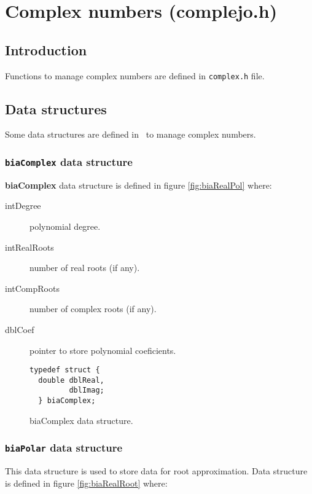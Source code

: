 %
%

\chapter{Complex numbers (complejo.h)}

\section{Introduction}

Functions to manage complex numbers are defined in \texttt{complex.h} file.

\section{Data structures}

Some data structures are defined in \BI \ to manage complex numbers.

\subsection{\texttt{biaComplex} data structure} \label{sec:biaComplex}

\textbf{biaComplex} data structure is defined in figure \ref{fig:biaRealPol} where:

\begin{description}
\item[intDegree] polynomial degree.
\item[intRealRoots] number of real roots (if any).
\item[intCompRoots] number of complex roots (if any).
\item[dblCoef] pointer to store polynomial coeficients.
\end{description}

\begin{figure}[!h]
\begin{verbatim}
typedef struct {
  double dblReal,
         dblImag;
  } biaComplex;
\end{verbatim}
\caption{biaComplex data structure.} \label{fig:biaComplex}
\end{figure}

\subsection{\texttt{biaPolar} data structure} \label{sec:biaPolar}

This data structure is used to store data for root approximation. Data structure is defined in figure \ref{fig:biaRealRoot} where:

